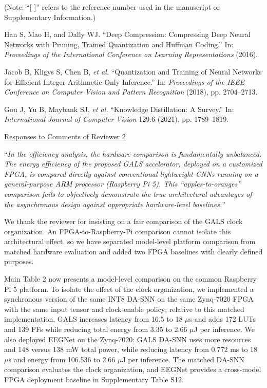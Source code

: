 \documentclass[12pt,technote,onecolumn]{IEEEtran}
\begin{document}
\noindent(Note: ``[ ]'' refers to the reference number used in the manuscript or Supplementary Information.)

\noindent[20]\:Han S, Mao H, and Dally WJ. ``Deep Compression: Compressing Deep Neural Networks with Pruning, Trained Quantization and Huffman Coding.'' In: \textit{Proceedings of the International Conference on Learning Representations} (2016).

\noindent[21]\:Jacob B, Kligys S, Chen B, \textit{et al.} ``Quantization and Training of Neural Networks for Efficient Integer-Arithmetic-Only Inference.'' In: \textit{Proceedings of the IEEE Conference on Computer Vision and Pattern Recognition} (2018), pp. 2704--2713.

\noindent[22]\:Gou J, Yu B, Maybank SJ, \textit{et al.} ``Knowledge Distillation: A Survey.'' In: \textit{International Journal of Computer Vision} 129.6 (2021), pp. 1789--1819.

\newpage
\clearpage
\begin{center}
\underline{Responses to Comments of Reviewer 2}
\end{center}
\vspace{3mm}

\vspace{4mm}

``{\it In the efficiency analysis, the hardware comparison is fundamentally
unbalanced. The energy efficiency of the proposed GALS accelerator,
deployed on a customized FPGA, is compared directly against conventional
lightweight CNNs running on a general-purpose ARM processor (Raspberry
Pi 5). This ``apples-to-oranges'' comparison fails to objectively
demonstrate the true architectural advantages of the asynchronous design
against appropriate hardware-level baselines.}''
\vspace{1mm}


We thank the reviewer for insisting on a fair comparison of the GALS clock organization. An FPGA-to-Raspberry-Pi comparison cannot isolate this architectural effect, so we have separated model-level platform comparison from matched hardware evaluation and added two FPGA baselines with clearly defined purposes.

Main Table 2 now presents a model-level comparison on the common
Raspberry Pi 5 platform. To isolate the effect of the clock
organization, we implemented a synchronous version of the same INT8
DA-SNN on the same Zynq-7020 FPGA with the same input tensor and
clock-enable policy; relative to this matched implementation, GALS
increases latency from 16.5 to 18 $\mu$s and adds 172 LUTs and 139 FFs while
reducing total energy from 3.35 to 2.66 $\mu$J per inference. We also
deployed EEGNet on the Zynq-7020: GALS DA-SNN uses more resources and
148 versus 138 mW total power, while reducing latency from 0.772 ms to
18 $\mu$s and energy from 106.536 to 2.66 $\mu$J per inference. The matched
DA-SNN comparison evaluates the clock organization, and EEGNet provides
a cross-model FPGA deployment baseline in Supplementary Table S12.
\end{document}
